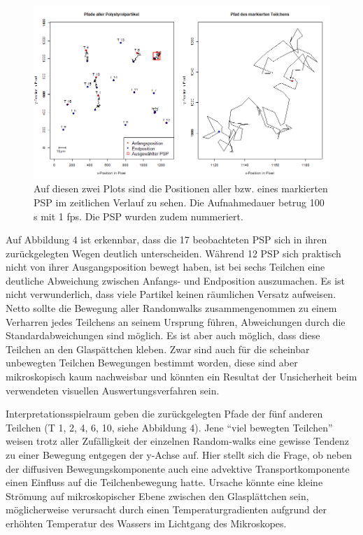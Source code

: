 \documentclass[
  9pt,
]{article}
\begin{document}
\begin{figure}
\centering
\includegraphics[width=\textwidth,height=0.2\textheight]{code/Plots/Raum.png}
\caption{Auf diesen zwei Plots sind die Positionen aller bzw. eines
markierten PSP im zeitlichen Verlauf zu sehen. Die Aufnahmedauer betrug
100 s mit 1 fps. Die PSP wurden zudem nummeriert.}
\end{figure}

Auf Abbildung 4 ist erkennbar, dass die 17 beobachteten PSP sich in
ihren zurückgelegten Wegen deutlich unterscheiden. Während 12 PSP sich
praktisch nicht von ihrer Ausgangsposition bewegt haben, ist bei sechs
Teilchen eine deutliche Abweichung zwischen Anfangs- und Endposition
auszumachen. Es ist nicht verwunderlich, dass viele Partikel keinen
räumlichen Versatz aufweisen. Netto sollte die Bewegung aller
Randomwalks zusammengenommen zu einem Verharren jedes Teilchens an
seinem Ursprung führen, Abweichungen durch die Standardabweichungen sind
möglich. Es ist aber auch möglich, dass diese Teilchen an den
Glaspättchen kleben. Zwar sind auch für die scheinbar unbewegten
Teilchen Bewegungen bestimmt worden, diese sind aber mikroskopisch kaum
nachweisbar und könnten ein Resultat der Unsicherheit beim verwendeten
visuellen Auswertungsverfahren sein.

Interpretationsspielraum geben die zurückgelegten Pfade der fünf anderen
Teilchen (T 1, 2, 4, 6, 10, siehe Abbildung 4). Jene ``viel bewegten
Teilchen'' weisen trotz aller Zufälligkeit der einzelnen Random-walks
eine gewisse Tendenz zu einer Bewegung entgegen der y-Achse auf. Hier
stellt sich die Frage, ob neben der diffusiven Bewegungskomponente auch
eine advektive Transportkomponente einen Einfluss auf die
Teilchenbewegung hatte. Ursache könnte eine kleine Strömung auf
mikroskopischer Ebene zwischen den Glasplättchen sein, möglicherweise
verursacht durch einen Temperaturgradienten aufgrund der erhöhten
Temperatur des Wassers im Lichtgang des Mikroskopes.
\end{document}
